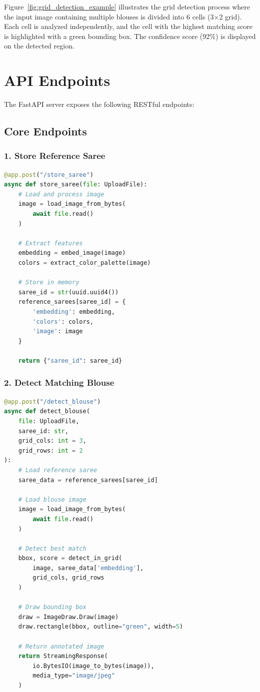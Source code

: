 \documentclass[12pt,a4paper]{report}
\begin{document}
Figure~\ref{fig:grid_detection_example} illustrates the grid detection process where the input image containing multiple blouses is divided into 6 cells (3×2 grid). Each cell is analyzed independently, and the cell with the highest matching score is highlighted with a green bounding box. The confidence score (92\%) is displayed on the detected region.

\section{API Endpoints}

The FastAPI server exposes the following RESTful endpoints:

\subsection{Core Endpoints}

\subsubsection{1. Store Reference Saree}

\begin{lstlisting}[language=Python]
@app.post("/store_saree")
async def store_saree(file: UploadFile):
    # Load and process image
    image = load_image_from_bytes(
        await file.read()
    )
    
    # Extract features
    embedding = embed_image(image)
    colors = extract_color_palette(image)
    
    # Store in memory
    saree_id = str(uuid.uuid4())
    reference_sarees[saree_id] = {
        'embedding': embedding,
        'colors': colors,
        'image': image
    }
    
    return {"saree_id": saree_id}
\end{lstlisting}

\subsubsection{2. Detect Matching Blouse}

\begin{lstlisting}[language=Python]
@app.post("/detect_blouse")
async def detect_blouse(
    file: UploadFile,
    saree_id: str,
    grid_cols: int = 3,
    grid_rows: int = 2
):
    # Load reference saree
    saree_data = reference_sarees[saree_id]
    
    # Load blouse image
    image = load_image_from_bytes(
        await file.read()
    )
    
    # Detect best match
    bbox, score = detect_in_grid(
        image, saree_data['embedding'],
        grid_cols, grid_rows
    )
    
    # Draw bounding box
    draw = ImageDraw.Draw(image)
    draw.rectangle(bbox, outline="green", width=5)
    
    # Return annotated image
    return StreamingResponse(
        io.BytesIO(image_to_bytes(image)),
        media_type="image/jpeg"
    )
\end{lstlisting}
\end{document}
